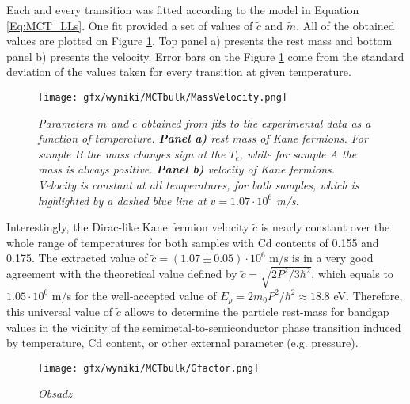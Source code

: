 \documentclass[titlepage,a4paper]{book}
\begin{document}
Each and every transition was fitted according to the model in Equation \ref{Eq:MCT_LLs}. One fit provided a set of values of $\tilde{c}$ and $\tilde{m}$. All of the obtained values are plotted on Figure \ref{fig:Bulk_MassVelocity}. Top panel a) presents the rest mass and bottom panel b) presents the velocity. Error bars on the Figure \ref{fig:Bulk_MassVelocity} come from the standard deviation of the values taken for every transition at given temperature.

\begin{figure}[ht]
	\centering
	\texttt{[image: gfx/wyniki/MCTbulk/MassVelocity.png]}
	\vspace{-10pt}
	\caption{\textit{Parameters $\tilde{m}$ and $\tilde{c}$ obtained from fits to the experimental data as a function of temperature. \textbf{Panel a)} rest mass of Kane fermions. For sample B the mass changes sign at the $T_c$, while for sample A the mass is always positive. \textbf{Panel b)} velocity of Kane fermions. Velocity is constant at all temperatures, for both samples, which is highlighted by a dashed blue line at $v = 1.07 \cdot 10^6$ m/s. }}
	\label{fig:Bulk_MassVelocity}
\end{figure}

Interestingly, the Dirac-like Kane fermion velocity $\tilde{c}$ is nearly constant over the whole range of temperatures for both samples with Cd contents of 0.155 and 0.175. The extracted value of $\tilde{c} = (1.07 \pm 0.05)\cdot 10^6$ m/s is in a very good agreement with the theoretical value defined by $\tilde{c} = \sqrt{2 P^2/3\hbar^2}$, which equals to $1.05 \cdot 10^6$ m/s for the well-accepted value of $E_p = 2m_0 P^2/ \hbar^2 \approx 18.8$ eV. Therefore, this universal value of $\tilde{c}$ allows to determine the particle rest-mass for bandgap values in the vicinity of the semimetal-to-semiconductor phase transition induced by temperature, Cd content, or other external parameter (e.g. pressure).

\begin{figure}[ht]
	\centering
	\texttt{[image: gfx/wyniki/MCTbulk/Gfactor.png]}
	\vspace{-10pt}
	\caption{\textit{Obsadz}}
	\label{fig:Bulk_gfactor}
\end{figure}
\end{document}
